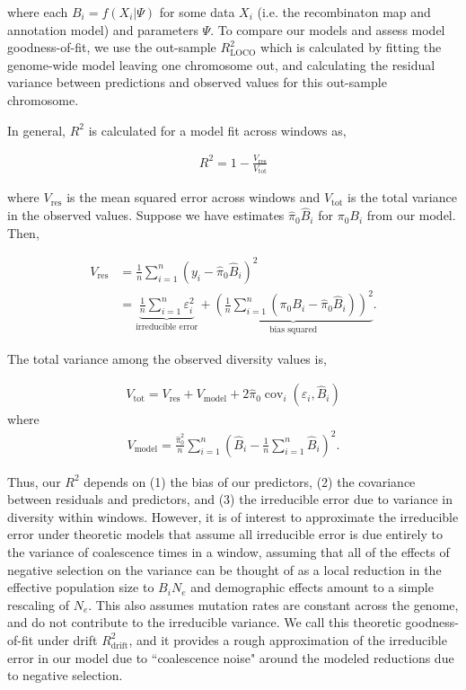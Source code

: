 \documentclass[11pt]{article}
\DeclareMathOperator{\cov}{cov}
\begin{document}
where each $B_i = f(X_i | \Psi)$ for some data $X_i$ (i.e. the recombinaton map
and annotation model) and parameters $\Psi$. To compare our models and assess
model goodness-of-fit, we use the out-sample $R_\text{LOCO}^2$ which is
calculated by fitting the genome-wide model leaving one chromosome out, and
calculating the residual variance between predictions and observed values for
this out-sample chromosome. 

In general, $R^2$ is calculated for a model fit across windows as,

\begin{align}
    R^2 = 1 - \frac{V_\text{res}}{V_\text{tot}}
\end{align}

where $V_\text{res}$ is the mean squared error across windows and
$V_\text{tot}$ is the total variance in the observed values. Suppose we have
estimates $\widehat{\pi}_0 \widehat{B}_i$ for $\pi_0 B_i$ from our model. Then,

\begin{align}
    V_\text{res} &= \frac{1}{n} \sum_{i=1}^n (y_i - \widehat{\pi}_0 \widehat{B}_i)^2  \\
                 &= \underbrace{\frac{1}{n} \sum_{i=1}^n \varepsilon_i^2}_\text{irreducible error} + \underbrace{\left(\frac{1}{n} \sum_{i=1}^n (\pi_0 B_i - \widehat{\pi}_0 \widehat{B}_i)\right)^2}_\text{bias squared}.
\end{align}

The total variance among the observed diversity values is,

\begin{align}
    V_\text{tot} = V_\text{res} + V_\text{model} + 2\widehat{\pi}_0\cov_i(\varepsilon_i, \widehat{B}_i)
\end{align}
where 
\begin{align}
    V_\text{model} = \frac{\widehat{\pi}_0^2}{n} \sum_{i=1}^n \left(\widehat{B}_i - \frac{1}{n}\sum_{i=1}^n\widehat{B}_i\right)^2.
\end{align}

Thus, our $R^2$ depends on (1) the bias of our predictors, (2) the covariance
between residuals and predictors, and (3) the irreducible error due to variance
in diversity within windows. However, it is of interest to approximate the
irreducible error under theoretic models that assume all irreducible error is
due entirely to the variance of coalescence times in a window, assuming that
all of the effects of negative selection on the variance can be thought of as a
local reduction in the effective population size to $B_i N_e$ and demographic
effects amount to a simple rescaling of $N_e$. This also assumes mutation rates
are constant across the genome, and do not contribute to the irreducible
variance. We call this theoretic goodness-of-fit under drift
$R_\text{drift}^2$, and it provides a rough approximation of the irreducible
error in our model due to ``coalescence noise" around the modeled reductions
due to negative selection.
\end{document}
